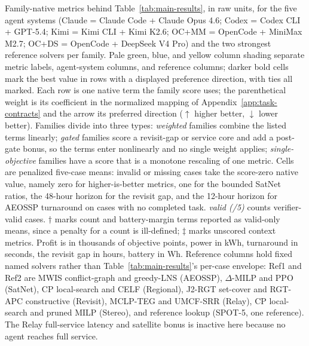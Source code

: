 \documentclass[11pt]{article}
\begin{document}
\begin{table}[!t]
\caption{Family-native metrics behind Table~\ref{tab:main-results}, in raw units, for the five agent systems (Claude = Claude Code + Claude Opus 4.6; Codex = Codex CLI + GPT-5.4; Kimi = Kimi CLI + Kimi K2.6; OC+MM = OpenCode + MiniMax M2.7; OC+DS = OpenCode + DeepSeek V4 Pro) and the two strongest reference solvers per family. Pale green, blue, and yellow column shading separate metric labels, agent-system columns, and reference columns; darker bold cells mark the best value in rows with a displayed preference direction, with ties all marked. Each row is one native term the family score uses; the parenthetical weight is its coefficient in the normalized mapping of Appendix~\ref{app:task-contracts} and the arrow its preferred direction ($\uparrow$ higher better, $\downarrow$ lower better). Families divide into three types: \emph{weighted} families combine the listed terms linearly; \emph{gated} families score a revisit-gap or service core and add a post-gate bonus, so the terms enter nonlinearly and no single weight applies; \emph{single-objective} families have a score that is a monotone rescaling of one metric. Cells are penalized five-case means: invalid or missing cases take the score-zero native value, namely zero for higher-is-better metrics, one for the bounded SatNet ratios, the 48-hour horizon for the revisit gap, and the 12-hour horizon for AEOSSP turnaround on cases with no completed task. \emph{valid (/5)} counts verifier-valid cases. $\dagger$ marks count and battery-margin terms reported as valid-only means, since a penalty for a count is ill-defined; $\ddagger$ marks unscored context metrics. Profit is in thousands of objective points, power in kWh, turnaround in seconds, the revisit gap in hours, battery in Wh. Reference columns hold fixed named solvers rather than Table~\ref{tab:main-results}'s per-case envelope: Ref1 and Ref2 are MWIS conflict-graph and greedy-LNS (AEOSSP), $\Delta$-MILP and PPO (SatNet), CP local-search and CELF (Regional), J2-RGT set-cover and RGT-APC constructive (Revisit), MCLP-TEG and UMCF-SRR (Relay), CP local-search and pruned MILP (Stereo), and reference lookup (SPOT-5, one reference). The Relay full-service latency and satellite bonus is inactive here because no agent reaches full service.}
\label{tab:native-metrics}
\end{table}
\end{document}
